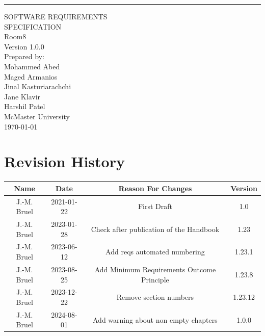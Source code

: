 \documentclass{scrreprt}
\date{}
\def\myversion{1.0.0 }
\theoremstyle{definition}
\begin{document}
\begin{center}
    \rule{16cm}{5pt}\vskip1cm
    \begin{bfseries}
        \Huge{SOFTWARE REQUIREMENTS\\ SPECIFICATION}\\
        \vspace{1.9cm}
        Room8\\
        \vspace{1.9cm}
        \LARGE{Version \myversion}\\
        \vspace{1.9cm}
        Prepared by:\\
        Mohammed Abed\\ 
        Maged Armanios\\
        Jinal Kasturiarachchi\\
        Jane Klavir\\
        Harshil Patel\\
        \vspace{0.9cm}
        McMaster University\\
        \vspace{0.9cm}
        \today\\
    \end{bfseries}
\end{center}

\chapter*{Revision History}

\begin{center}
    \begin{tabular}{|c|c|c|c|}
        \hline
	    Name        & Date          & Reason For Changes & Version\\
        \hline
        \hline
	    J.-M. Bruel & 2021-01-22    & First Draft & 1.0\\
        \hline
	    J.-M. Bruel & 2023-01-28    & Check after publication of the Handbook & 1.23\\
        \hline
	    J.-M. Bruel & 2023-06-12    & Add reqs automated numbering & 1.23.1 \\
        \hline
	    J.-M. Bruel & 2023-08-25    & Add Minimum Requirements Outcome Principle & 1.23.8 \\
        \hline
	    J.-M. Bruel & 2023-12-22    & Remove section numbers & 1.23.12 \\
        \hline
	    J.-M. Bruel & 2024-08-01    & Add warning about non empty chapters  & \myversion \\
        \hline
    \end{tabular}
\end{center}
\end{document}
